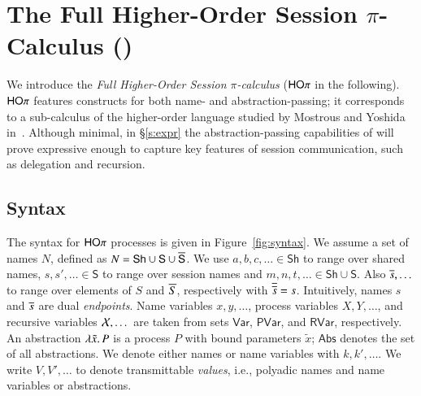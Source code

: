 
\section{The Full Higher-Order Session $\pi$-Calculus (\HOp)}

We introduce the {\em Full Higher-Order Session $\pi$-calculus}
($\mathsf{HO}\pi$ in the following).
$\mathsf{HO}\pi$ features constructs for both name- and abstraction-passing;
it corresponds to a sub-calculus 
of the higher-order language studied by Mostrous and Yoshida in~\cite{tlca07}.
Although minimal, in \S\ref{s:expr}
the abstraction-passing capabilities of \HOp will prove 
expressive enough to capture key features of session communication, 
such as delegation and recursion.

\subsection{Syntax}

The syntax for $\mathsf{HO}\pi$ processes is given in Figure~\ref{fig:syntax}.
We assume a set of names $N$, defined as $N = \mathsf{Sh} \cup \mathsf{S} \cup \overline{\mathsf{S}}$.
We use $a,b,c, \dots \in \mathsf{Sh}$ to range over shared names,
$s, s', \dots \in \mathsf{S}$ to range over session names and
$m, n, t, \dots \in \mathsf{Sh} \cup \mathsf{S}$.
Also $\overline{s}, \dots$
to range over elements of $S$ and $\overline{S}$, respectively with
$\overline{\overline{s}} = s$.
Intuitively, names $s$ and $\overline{s}$ are dual \emph{endpoints}.
Name variables $x, y,  \dots$, 
process variables $X, Y,  \dots$,
and recursive variables $\mathcal{X}, \dots$ 
are taken from sets $\mathsf{Var}$, $\mathsf{PVar}$, and $\mathsf{RVar}$, respectively. 
An abstraction $\lambda \tilde{x}.\,P$ is a process $P$ with bound parameters $\tilde{x}$;
$\mathsf{Abs}$ denotes the set of all abstractions.
We denote either names or name variables with $k, k', \dots$.
We write $V, V', \ldots$ to denote 
transmittable \emph{values}, i.e., 
polyadic names and name variables or abstractions.

